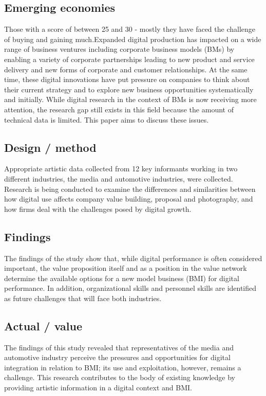 \documentclass{article}
\begin{document}
\subsection{Emerging economies}
Those with a score of between 25 and 30 - mostly they have faced the challenge of buying and gaining much.Expanded
digital production has impacted on a wide range of business ventures including corporate business models (BMs) by enabling a
variety of corporate partnerships leading to new product and service delivery and new forms of corporate and customer relationships.
At the same time, these digital innovations have put pressure on companies to think about their current strategy and to explore new
business opportunities systematically and initially. While digital research in the context of BMs is now receiving more attention,
the research gap still exists in this field because the amount of technical data is limited. This paper aims to discuss these issues.
\subsection{Design / method}
Appropriate artistic data collected from 12 key informants working in two different industries, the media and automotive
industries, were collected. Research is being conducted to examine the differences and similarities between how digital use affects
company value building, proposal and photography, and how firms deal with the challenges posed by digital growth.
\subsection{Findings}
The findings of the study show that, while digital performance is often considered important, the value proposition itself and
as a position in the value network determine the available options for a new model business (BMI) for digital performance. In
addition, organizational skills and personnel skills are identified as future challenges that will face both industries.
\subsection{Actual / value}
The findings of this study revealed that representatives of the media and automotive industry perceive the pressures and
opportunities for digital integration in relation to BMI; its use and exploitation, however, remains a challenge. This research
contributes to the body of existing knowledge by providing artistic information in a digital context and BMI.
\end{document}
